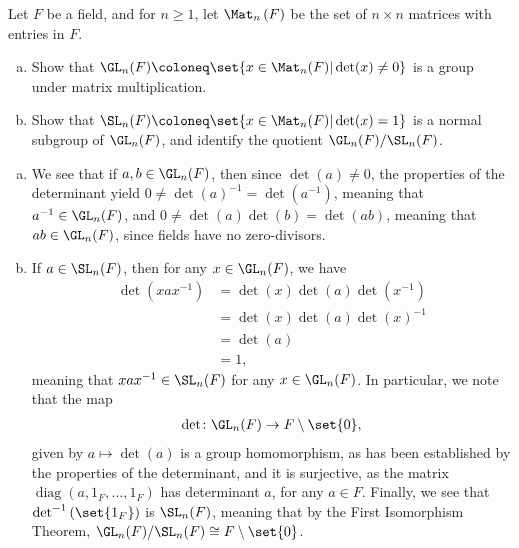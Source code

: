 \documentclass[10pt]{mypackage}
\begin{document}
\RaggedRight
\begin{problem}[Problem 1]
  Let $F$ be a field, and for $n\geq 1$, let $\Mat_{n}\left( F \right)$ be the set of $n\times n$ matrices with entries in $F$.
  \begin{enumerate}[(a)]
    \item Show that $\GL_n(F) \coloneq \set{x\in \Mat_n(F) | \det(x)\neq 0}$ is a group under matrix multiplication.
    \item Show that $\SL_n(F) \coloneq \set{x\in \Mat_n(F) | \det(x) = 1}$ is a normal subgroup of $\GL_n(F)$, and identify the quotient $\GL_n(F)/\SL_n(F)$.
  \end{enumerate}
\end{problem}
\begin{solution}\hfill
  \begin{enumerate}[(a)]
    \item We see that if $a,b\in \GL_n(F)$, then since $\det(a)\neq 0$, the properties of the determinant yield $0\neq \det\left( a \right)^{-1} = \det\left( a^{-1} \right)$, meaning that $a^{-1}\in \GL_n(F)$, and $0\neq \det(a)\det(b) = \det(ab)$, meaning that $ab\in \GL_n(F)$, since fields have no zero-divisors.
    \item If $a\in \SL_n(F)$, then for any $x\in \GL_n(F)$, we have
      \begin{align*}
        \det\left( xax^{-1} \right) &= \det\left( x \right)\det\left( a \right)\det\left( x^{-1} \right)\\
                                    &= \det\left( x \right)\det\left( a \right)\det\left( x \right)^{-1}\\
                                    &= \det\left( a \right)\\
                                    &= 1,
      \end{align*}
      meaning that $xax^{-1}\in \SL_n(F)$ for any $x\in \GL_n(F)$. In particular, we note that the map
      \begin{align*}
        \det\colon \GL_n(F) \rightarrow F\setminus\set{0},
      \end{align*}
      given by $a \mapsto \det(a)$ is a group homomorphism, as has been established by the properties of the determinant, and it is surjective, as the matrix $ \operatorname{diag}\left( a,1_F,\dots,1_F \right) $ has determinant $a$, for any $a\in F$. Finally, we see that $\det^{-1}\left( \set{1_F} \right)$ is $\SL_n(F)$, meaning that by the First Isomorphism Theorem, $\GL_n(F)/\SL_n(F) \cong F\setminus \set{0}$.
  \end{enumerate}
\end{solution}
\end{document}
